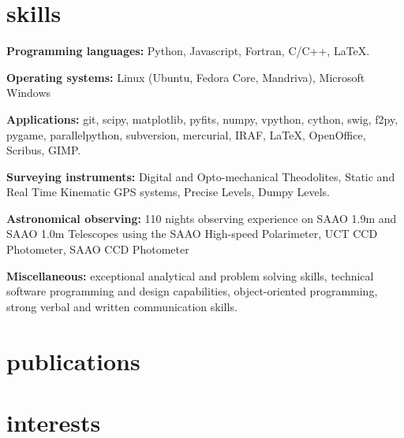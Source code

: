 \documentclass[]{friggeri-cv} %
\begin{document}

\section{skills}

\textbf{Programming languages:} Python, Javascript, Fortran, C/C++, \LaTeX.

\textbf{Operating systems:} Linux (Ubuntu, Fedora Core, Mandriva), Microsoft Windows 

\textbf{Applications:} git, scipy, matplotlib, pyfits, numpy, vpython, cython, swig, f2py, pygame, parallelpython, subversion, mercurial, IRAF, \LaTeX, OpenOffice, Scribus, GIMP.

\textbf{Surveying instruments:} Digital and Opto-mechanical Theodolites, Static and Real Time Kinematic GPS
    systems, Precise Levels, Dumpy Levels.
    
\textbf{Astronomical observing:} 110 nights observing experience on SAAO 1.9m and SAAO 1.0m Telescopes using
     the SAAO High-speed Polarimeter, UCT CCD Photometer, SAAO CCD Photometer

\textbf{Miscellaneous:} exceptional analytical and problem solving skills, technical software programming and design capabilities, object-oriented programming, strong verbal and written communication skills.



\begin{entrylist}
\end{entrylist}

\pagebreak
\section{publications}


\section{interests}
\end{document}
